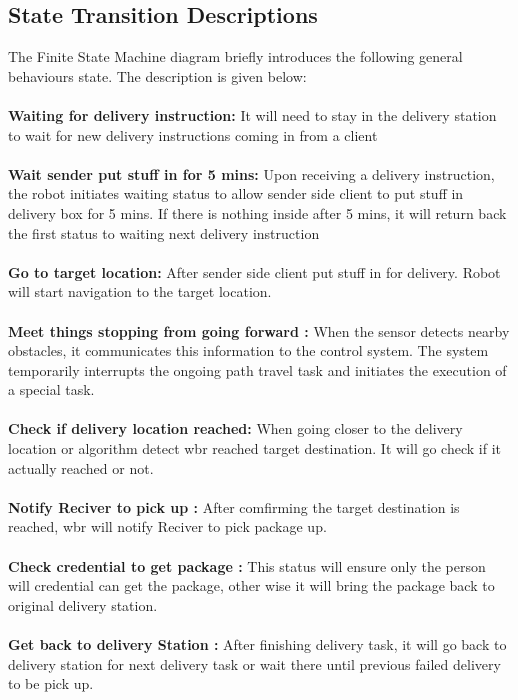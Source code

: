 \documentclass[12pt]{article}
\begin{document}
\subsection{State Transition Descriptions}
The Finite State Machine diagram briefly introduces the following general behaviours state. The description is given below:\\\\
\noindent\textbf{Waiting for delivery instruction:} It will need to stay in the delivery station to wait for new delivery instructions coming in from a client \\\\
\noindent\textbf{Wait sender put stuff in for 5 mins:} Upon receiving a  delivery instruction, the robot initiates waiting status to allow sender side client to put stuff in delivery box for 5 mins. If there is nothing inside after 5 mins, it will return back the first status to waiting next delivery instruction\\\\
\textbf{Go to target location:} After sender side client put stuff in for delivery. Robot will start navigation to the target location. \\\\
\textbf{Meet things stopping from going forward :} When the sensor detects nearby obstacles, it communicates this information to the control system. The system temporarily interrupts the ongoing path travel task and initiates the execution of a special task.\\\\
\textbf{Check if delivery location reached:} When going closer to the delivery location or algorithm detect \acrshort{wbr} reached target destination. It will go check if it actually reached or not.\\\\
\textbf{Notify Reciver to pick up :} After comfirming the target destination is reached, \acrshort{wbr} will notify Reciver to pick package up. \\\\
\textbf{Check credential to get package :} This status will ensure only the person will credential can get the package, other wise it will bring the package back to original delivery station.  \\\\
\textbf{Get back to delivery Station :} After finishing delivery task, it will go back to delivery station for next delivery task or wait there until previous failed delivery to be pick up. \\\\
\end{document}
